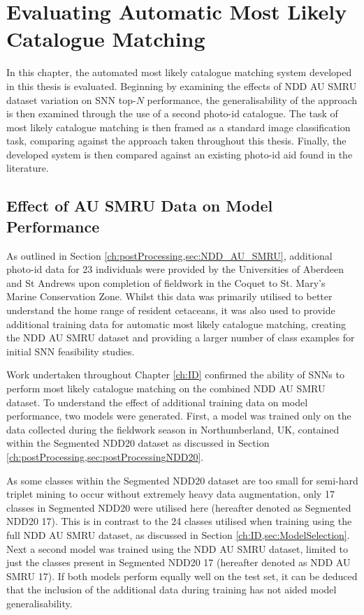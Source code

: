 \chapter{Evaluating Automatic Most Likely Catalogue Matching}\label{ch:SNNEvaluation}

In this chapter, the automated most likely catalogue matching system developed in this thesis is evaluated. Beginning by examining the effects of NDD AU SMRU dataset variation on SNN top-$N$ performance, the generalisability of the approach is then examined through the use of a second photo-id catalogue. The task of most likely catalogue matching is then framed as a standard image classification task, comparing against the approach taken throughout this thesis. Finally, the developed system is then compared against an existing photo-id aid found in the literature. 

\section{Effect of AU SMRU Data on Model Performance}\label{ch:SNNEvaluation,sec:EffectOfAUSMRU}

As outlined in Section \ref{ch:postProcessing,sec:NDD_AU_SMRU}, additional photo-id data for 23 individuals were provided by the Universities of Aberdeen and St Andrews upon completion of fieldwork in the Coquet to St. Mary's Marine Conservation Zone. Whilst this data was primarily utilised to better understand the home range of resident cetaceans, it was also used to provide additional training data for automatic most likely catalogue matching, creating the NDD AU SMRU dataset and providing a larger number of class examples for initial SNN feasibility studies. 

Work undertaken throughout Chapter \ref{ch:ID} confirmed the ability of SNNs to perform most likely catalogue matching on the combined NDD AU SMRU dataset. To understand the effect of additional training data on model performance, two models were generated. First, a model was trained only on the data collected during the fieldwork season in Northumberland, UK, contained within the Segmented NDD20 dataset as discussed in Section \ref{ch:postProcessing,sec:postProcessingNDD20}. 

As some classes within the Segmented NDD20 dataset are too small for semi-hard triplet mining to occur without extremely heavy data augmentation, only 17 classes in Segmented NDD20 were utilised here (hereafter denoted as Segmented NDD20 17). This is in contrast to the 24 classes utilised when training using the full NDD AU SMRU dataset, as discussed in Section \ref{ch:ID,sec:ModelSelection}. Next a second model was trained using the NDD AU SMRU dataset, limited to just the classes present in Segmented NDD20 17 (hereafter denoted as NDD AU SMRU 17). If both models perform equally well on the test set, it can be deduced that the inclusion of the additional data during training has not aided model generalisability. 

